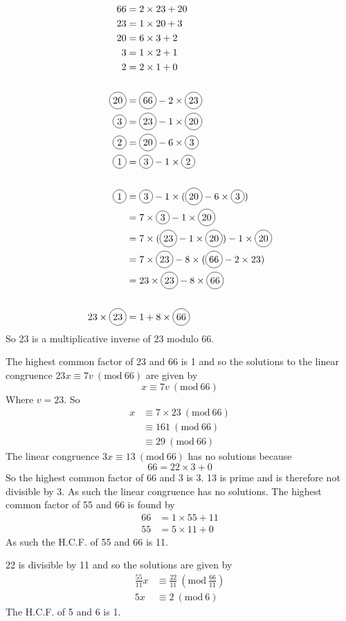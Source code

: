 \documentclass[a4paper,12pt]{article}
\newcommand{\Mod}[1]{\ (\mathrm{mod}\ #1)}
\newcommand*\circled[1]{\tikz[baseline=(char.base)]{
            \node[shape=circle,draw,inner sep=2pt] (char) {#1};}}
\numberwithin{equation}{section}
\begin{document}
\begin{question}
\qpart
\qsubpart
\begin{align*}
66 &= 2 \times 23 + 20\\
23 &= 1 \times 20 + 3\\
20 &= 6 \times 3 + 2\\
3 &= 1 \times 2 + 1\\
2 &= 2 \times 1 + 0\\
\\
\circled{20} &= \circled{66}-2\times\circled{23}\\
\circled{3} &= \circled{23}-1\times\circled{20}\\
\circled{2} &= \circled{20}-6\times\circled{3}\\
\circled{1} &= \circled{3}-1\times\circled{2}\\
\\
\circled{1} &= \circled{3}-1\times(\circled{20}-6\times\circled{3})\\
&= 7 \times \circled{3}-1\times\circled{20}\\
&= 7\times(\circled{23}-1\times\circled{20})-1\times\circled{20}\\
&= 7\times\circled{23}-8\times(\circled{66}-2\times{23})\\
&=23\times\circled{23}-8\times\circled{66}\\
\\
23\times\circled{23}&=1+8\times\circled{66}
\end{align*}
So 23 is a multiplicative inverse of 23 modulo 66.

The highest common factor of 23 and 66 is 1 and so the solutions to the linear congruence $23x\equiv7v\Mod{66}$ are given by
\[x\equiv7v\Mod{66}\]
Where $v=23$. So
\begin{align*}
x&\equiv7\times23\Mod{66}\\
&\equiv161\Mod{66}\\
&\equiv29\Mod{66}
\end{align*}
\qsubpart
The linear congruence $3x\equiv13\Mod{66}$ has no solutions because
\[66=22\times3+0\]
So the highest common factor of 66 and 3 is 3. 13 is prime and is therefore not divisible by 3. As such the linear congruence has no solutions.
\qsubpart
The highest common factor of 55 and 66 is found by
\begin{align*}
66&=1\times55+11\\
55&=5\times11+0
\end{align*}
As such the H.C.F. of 55 and 66 is 11.

22 is divisible by 11 and so the solutions are given by
\begin{align*}
\frac{55}{11}x&\equiv\frac{22}{11}\Mod{\frac{66}{11}}\\
5x&\equiv2\Mod{6}
\end{align*}
The H.C.F. of 5 and 6 is 1.


\end{question}
\end{document}

